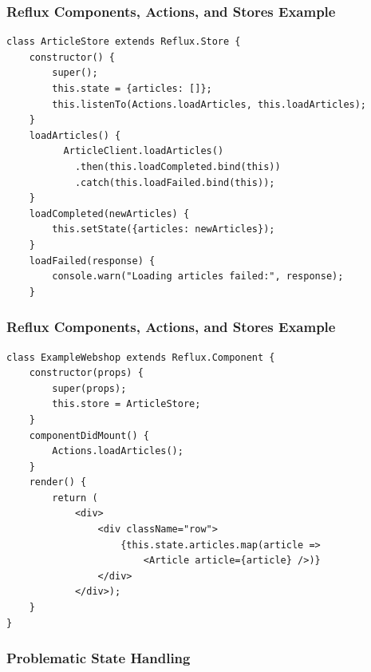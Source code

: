\documentclass{beamer}
\begin{document}
\begin{frame}[fragile]\frametitle{Reflux Components, Actions, and Stores \textendash{} Example}
\begin{lstlisting}[style=htmlcssjs]
class ArticleStore extends Reflux.Store {
    constructor() {
        super();
        this.state = {articles: []};
        this.listenTo(Actions.loadArticles, this.loadArticles);
    }
    loadArticles() {
          ArticleClient.loadArticles()
            .then(this.loadCompleted.bind(this))
            .catch(this.loadFailed.bind(this));
    }
    loadCompleted(newArticles) {
        this.setState({articles: newArticles});
    }
    loadFailed(response) {
        console.warn("Loading articles failed:", response);
    }
\end{lstlisting}
\end{frame}

\begin{frame}[fragile]\frametitle{Reflux Components, Actions, and Stores \textendash{} Example}
\begin{lstlisting}[style=htmlcssjs]
class ExampleWebshop extends Reflux.Component {
    constructor(props) {
        super(props);
        this.store = ArticleStore;
    }
    componentDidMount() {
        Actions.loadArticles();
    }
    render() {
        return (
            <div>
                <div className="row">
                    {this.state.articles.map(article =>
                        <Article article={article} />)}
                </div>
            </div>);
    }
}
\end{lstlisting}
\end{frame}

\webshopexample

\begin{frame}\frametitle{Problematic State Handling}
\begin{itemize}
\end{itemize}
\end{frame}
\end{document}
